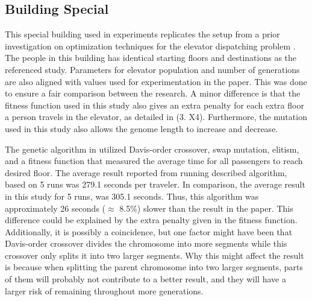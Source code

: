 \newpage

\subsection{Building Special}
This special building used in experiments replicates the setup from a prior investigation on optimization techniques for the elevator dispatching problem \cite{gharieb2005optimal}. The people in this building has identical starting floors and destinations as the referenced study. Parameters for elevator population and number of generations are also aligned with values used for experimentation in the paper. This was done to ensure a fair comparison between the research. A minor difference is that the fitness function used in this study also gives an extra penalty for each extra floor a person travels in the elevator, as detailed in (3. X4). Furthermore, the mutation used in this study also allows the genome length to increase and decrease.

The genetic algorithm in \cite{gharieb2005optimal} utilized Davis-order crossover, swap mutation, elitism, and a fitness function that measured the average time for all passengers to reach desired floor. The average result reported from running described algorithm, based on 5 runs was 279.1 seconds per traveler. In comparison, the average result in this study for 5 runs, was 305.1 seconds. Thus, this algorithm was approximately 26 seconds ($\approx$ 8.5\%) slower than the result in the paper. This difference could be explained by the extra penalty given in the fitness function. Additionally, it is possibly a coincidence, but one factor might have been that Davis-order crossover divides the chromosome into more segments while this crossover only splits it into two larger segments. Why this might affect the result is because when splitting the parent chromosome into two larger segments, parts of them will probably not contribute to a better result, and they will have a larger risk of remaining throughout more generations.